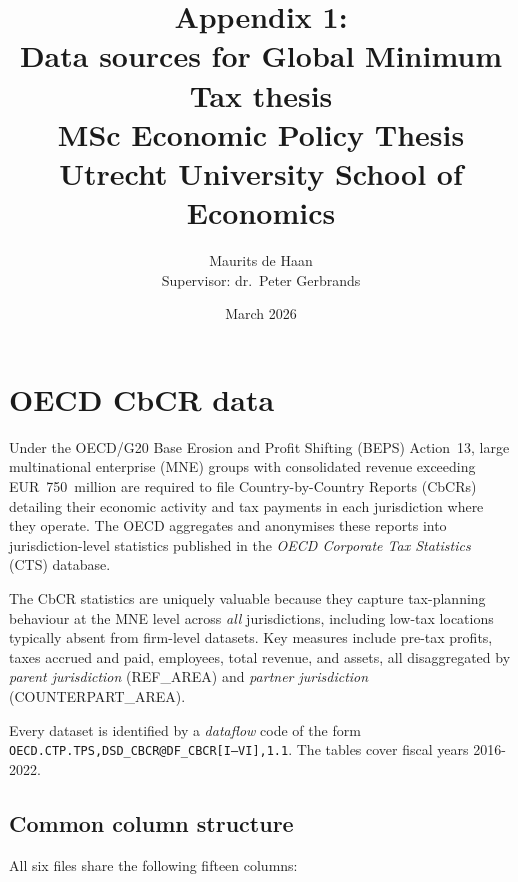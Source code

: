 \documentclass[11pt,a4paper]{article}
\title{\textbf{Appendix 1:\\ Data sources for Global Minimum Tax thesis}\\[0.5em]
\large MSc Economic Policy Thesis\\Utrecht University School of Economics}
\author{Maurits de Haan\\[0.3em]
\small Supervisor: dr.\ Peter Gerbrands}
\date{March 2026}
\newcommand{\code}[1]{\texttt{#1}}
\begin{document}
\maketitle

\newpage
\tableofcontents
\newpage

\section{OECD CbCR data}

Under the OECD/G20 Base Erosion and Profit Shifting (BEPS) Action~13, large multinational enterprise (MNE) groups with consolidated revenue exceeding EUR~750~million are required to file Country-by-Country Reports (CbCRs) detailing their economic activity and tax payments in each jurisdiction where they operate. The OECD aggregates and anonymises these reports into jurisdiction-level statistics published in the \emph{OECD Corporate Tax Statistics} (CTS) database.

The CbCR statistics are uniquely valuable because they capture tax-planning behaviour at the MNE level across \emph{all} jurisdictions, including low-tax locations typically absent from firm-level datasets. Key measures include pre-tax profits, taxes accrued and paid, employees, total revenue, and assets, all disaggregated by \emph{parent jurisdiction} (REF\_AREA) and \emph{partner jurisdiction} (COUNTERPART\_AREA).

Every dataset is identified by a \emph{dataflow} code of the form \code{OECD.CTP.TPS,DSD\_CBCR@DF\_CBCR[I--VI],1.1}. The tables cover fiscal years 2016-2022.

\subsection{Common column structure}

All six files share the following fifteen columns:
\end{document}
